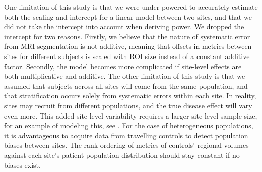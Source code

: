 One limitation of this study is that we were under-powered to accurately estimate both the scaling and intercept for a linear model between two sites, and that we did not take the intercept into account when deriving power. We dropped the intercept for two reasons. Firstly, we believe that the nature of systematic error from MRI segmentation is not additive, meaning that offsets in metrics between sites for different subjects is scaled with ROI size instead of a constant additive factor. Secondly, the model becomes more complicated if site-level effects are both multiplicative and additive. The other limitation of this study is that we assumed that subjects across all sites will come from the same population, and that stratification occurs solely from systematic errors within each site. In reality, sites may recruit from different populations, and the true disease effect will vary even more. This added site-level variability requires a larger site-level sample size, for an example of modeling this, see \cite{enigmarandom}. For the case of heterogeneous populations, it is advantageous to acquire data from travelling controls to detect population biases between sites. The rank-ordering of metrics of controls' regional volumes against each site's patient population distribution should stay constant if no biases exist.